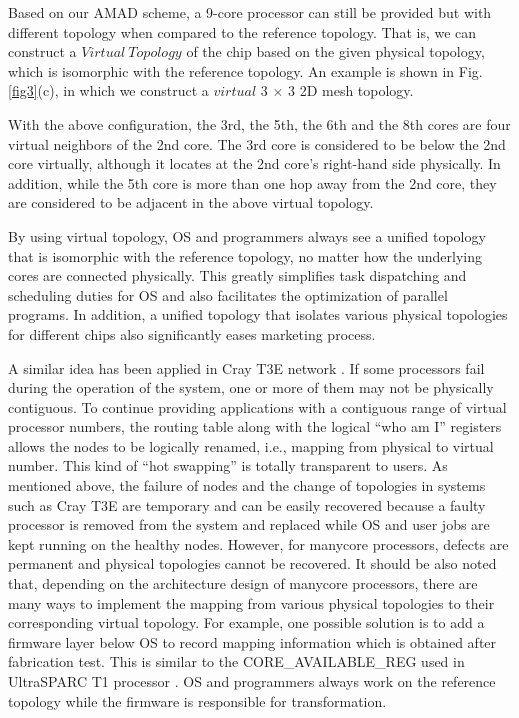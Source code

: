 Based on our AMAD scheme, a 9-core processor can still be provided but with different topology when compared to the reference topology. That is, we can construct a $Virtual\ Topology$ of the chip based on the given physical topology, which is isomorphic with the reference topology. An example is shown in Fig.\ref{fig3}(c), in which we construct a $virtual$ 3 $\times$ 3 2D mesh topology.

With the above configuration, the 3rd, the 5th, the 6th and the 8th cores are four virtual neighbors of the 2nd core. The 3rd core is considered to be below the 2nd core virtually, although it locates at the 2nd core’s right-hand side physically. In addition, while the 5th core is more than one hop away from the 2nd core, they are considered to be adjacent in the above virtual topology.

By using virtual topology, OS and programmers always see a unified topology that is isomorphic with the reference topology, no matter how the underlying cores are connected physically. This greatly simplifies task dispatching and scheduling duties for OS and also facilitates the optimization of parallel programs. In addition, a unified topology that isolates various physical topologies for different chips also significantly eases marketing
process.

A similar idea has been applied in Cray T3E network \cite{scott1996cray}. If some processors fail during the operation of the system, one or more of them may not be physically contiguous. To continue providing applications with a contiguous range of virtual processor numbers, the routing table along with the logical “who am I” registers allows the nodes to be logically renamed, i.e., mapping from physical to virtual number. This kind of “hot swapping” is totally transparent to users. As mentioned above, the failure of nodes and the change of topologies in systems such as Cray T3E are temporary and can be easily recovered because a faulty processor is removed from the system and replaced while OS and user jobs are kept running on the healthy nodes. However, for manycore processors, defects are permanent and physical topologies cannot be recovered. It should be also noted that, depending on the architecture design of manycore processors, there are many ways to implement the mapping from various physical topologies to their corresponding virtual topology. For example, one possible solution is to add a firmware layer below OS to record mapping information which is obtained after fabrication test. This is similar to the CORE\_AVAILABLE\_REG used in UltraSPARC T1 processor \cite{parulkar2002scalable,tan2006testing}. OS and programmers always work on the reference topology while the firmware is responsible for transformation.

